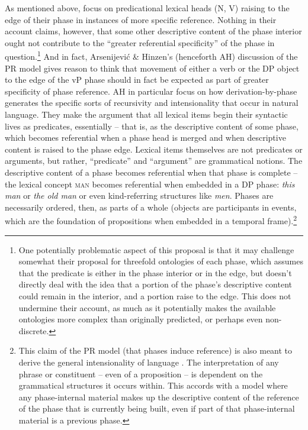 \documentclass[output=paper
,modfonts
,nonflat
]{langsci/langscibook}
\begin{document}
As mentioned above, \citet{SheehanHinzen:2011} focus on predicational lexical heads (N, V) raising to the edge of their phase in instances of more specific reference. Nothing in their account claims, however, that some other descriptive content of the phase interior ought not contribute to the ``greater referential specificity'' of the phase in question.\footnote{One potentially problematic aspect of this proposal is that it may challenge somewhat their proposal for threefold ontologies of each phase, which assumes that the predicate is either in the phase interior or in the edge, but doesn’t directly deal with the idea that a portion of the phase's descriptive content could remain in the interior, and a portion raise to the edge. This does not undermine their account, as much as it potentially makes the available ontologies more complex than originally predicted, or perhaps even non-discrete.}  And in fact, Arsenijevi{\'c} \& Hinzen's \citeyear{ArsenijevicHinzen:2012} (henceforth AH) discussion of the PR model gives reason to think that movement of either a verb or the DP object to the edge of the vP phase should in fact be expected as part of greater specificity of phase reference. AH in particular focus on how derivation-by-phase generates the specific sorts of recursivity and intensionality that occur in natural language. They make the argument that all lexical items begin their syntactic lives as predicates, essentially -- that is, as the descriptive content of some phase, which becomes referential when a phase head is merged and when descriptive content is raised to the phase edge. Lexical items themselves are not predicates or arguments, but rather, ``predicate'' and ``argument'' are grammatical notions. The descriptive content of a phase becomes referential when that phase is complete -- the lexical concept \textsc{man} becomes referential when embedded in a DP phase: \textit{this man} or \textit{the old man} or even kind-referring structures like \textit{men}. Phases are necessarily ordered, then, as parts of a whole (objects are participants in events, which are the foundation of propositions when embedded in a temporal frame).\footnote{This claim of the PR model (that phases induce reference) is also meant to derive the general intensionality of language \citep{Hinzen:2014b,ArsenijevicHinzen:2012,HinzenSheehan:2013}. The interpretation of any phrase or constituent -- even of a proposition -- is dependent on the grammatical structures it occurs within. This accords with a model where any phase-internal material makes up the descriptive content of the reference of the phase that is currently being built, even if part of that phase-internal material is a previous phase.} 
\end{document}
